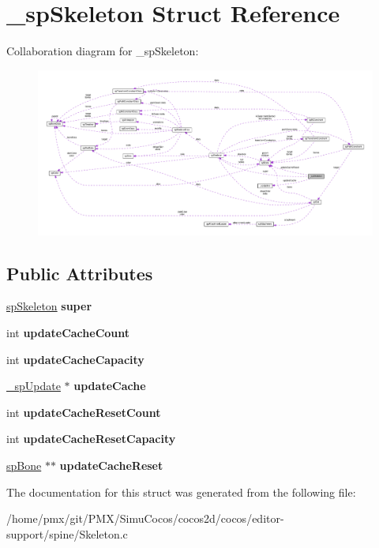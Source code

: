 \hypertarget{struct__spSkeleton}{}\section{\+\_\+sp\+Skeleton Struct Reference}
\label{struct__spSkeleton}


Collaboration diagram for \+\_\+sp\+Skeleton\+:
\nopagebreak
\begin{figure}[H]
\begin{center}
\leavevmode
\includegraphics[width=350pt]{struct__spSkeleton__coll__graph}
\end{center}
\end{figure}
\subsection*{Public Attributes}
\begin{DoxyCompactItemize}
\item 
\mbox{\label{struct__spSkeleton_a74fec8a5486c0068b043a5106dfcc968}} 
\hyperlink{structspSkeleton}{sp\+Skeleton} {\bfseries super}
\item 
\mbox{\label{struct__spSkeleton_ad7281954bf662db23b397a21c2a4550e}} 
int {\bfseries update\+Cache\+Count}
\item 
\mbox{\label{struct__spSkeleton_a57b138594da67a0375a80f63b4292425}} 
int {\bfseries update\+Cache\+Capacity}
\item 
\mbox{\label{struct__spSkeleton_ad1214bf89446be50faac32b4fe538c62}} 
\hyperlink{struct__spUpdate}{\+\_\+sp\+Update} $\ast$ {\bfseries update\+Cache}
\item 
\mbox{\label{struct__spSkeleton_aac1fa8e0a9411582242cd04f0061ea0b}} 
int {\bfseries update\+Cache\+Reset\+Count}
\item 
\mbox{\label{struct__spSkeleton_a71afd883fe32a78fb283954bb1ba452d}} 
int {\bfseries update\+Cache\+Reset\+Capacity}
\item 
\mbox{\label{struct__spSkeleton_a5b57e8ba2aed592c44373ec1a3c469c9}} 
\hyperlink{structspBone}{sp\+Bone} $\ast$$\ast$ {\bfseries update\+Cache\+Reset}
\end{DoxyCompactItemize}


The documentation for this struct was generated from the following file\+:\begin{DoxyCompactItemize}
\item 
/home/pmx/git/\+P\+M\+X/\+Simu\+Cocos/cocos2d/cocos/editor-\/support/spine/Skeleton.\+c\end{DoxyCompactItemize}
